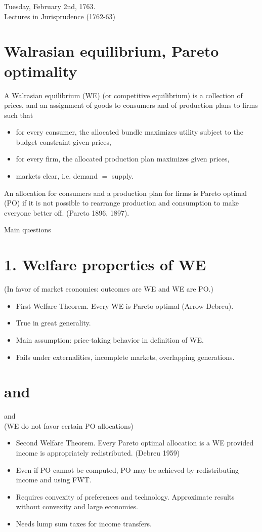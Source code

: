 \documentclass[10pt]{article}
\begin{document}
Tuesday, February 2nd, 1763.\\
Lectures in Jurisprudence (1762-63)

\section*{Walrasian equilibrium, Pareto optimality}
A Walrasian equilibrium (WE) (or competitive equilibrium) is a collection of prices, and an assignment of goods to consumers and of production plans to firms such that

\begin{itemize}
  \item for every consumer, the allocated bundle maximizes utility subject to the budget constraint given prices,
  \item for every firm, the allocated production plan maximizes given prices,
  \item markets clear, i.e. demand $=$ supply.
\end{itemize}

An allocation for consumers and a production plan for firms is Pareto optimal (PO) if it is not possible to rearrange production and consumption to make everyone better off. (Pareto 1896, 1897).

Main questions

\section*{1. Welfare properties of WE}
(In favor of market economies: outcomes are WE and WE are PO.)

\begin{itemize}
  \item First Welfare Theorem. Every WE is Pareto optimal (Arrow-Debreu).
  \item True in great generality.
  \item Main assumption: price-taking behavior in definition of WE.
  \item Fails under externalities, incomplete markets, overlapping generations.
\end{itemize}

\section*{and}
and\\
(WE do not favor certain PO allocations)

\begin{itemize}
  \item Second Welfare Theorem. Every Pareto optimal allocation is a WE provided income is appropriately redistributed. (Debreu 1959)
  \item Even if PO cannot be computed, PO may be achieved by redistributing income and using FWT.
  \item Requires convexity of preferences and technology. Approximate results without convexity and large economies.
  \item Needs lump sum taxes for income transfers.
\end{itemize}
\end{document}
